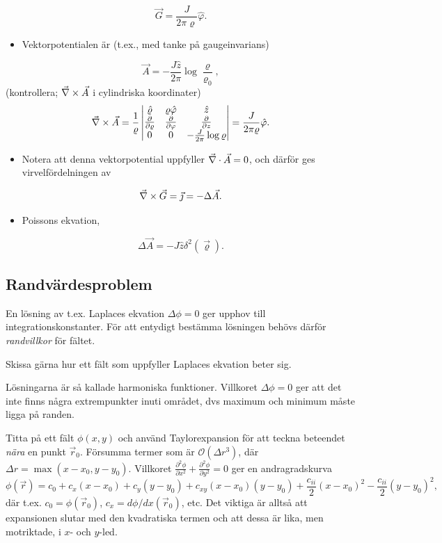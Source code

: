 \documentclass[%
oneside,                 %
final,                   %
10pt]{article}
\newenvironment{warning_mdfboxadmon}[1][]{
\begin{warning_mdfboxmdframed}[frametitle=#1]
}
{
\end{warning_mdfboxmdframed}
}
\begin{document}
\noindent
$$
\vec G=\frac{J}{2\pi\varrho}\hat\varphi.
$$
\begin{itemize}
\item Vektorpotentialen är (t.ex., med tanke på gaugeinvarians)
\end{itemize}

\noindent
$$
\vec A=-\frac{J\hat z}{2\pi}\log\frac{\varrho}{\varrho_0},
$$
(kontrollera; $\vec{\nabla}\times\vec A$ i cylindriska koordinater)
$$
\vec{\nabla}\times\vec A=\frac{1}{\varrho}
	\begin{vmatrix}
        \hat\varrho & \varrho\hat\varphi & \hat z \\ \frac{\partial}{\partial \varrho} & 
\frac{\partial}{\partial \varphi} &
        \frac{\partial}{\partial z} \\ 0\mbox{} & 0\mbox{} & -\frac{J}{2\pi}\log\varrho \\
        \end{vmatrix}
           =\frac{J}{2\pi\varrho}\hat\varphi.
$$
\begin{itemize}
\item Notera att denna vektorpotential uppfyller $\vec{\nabla}\cdot\vec A=0$, och därför ges virvelfördelningen av 
\end{itemize}

\noindent
$$
\vec{\nabla} \times \vec{G} = \vec{\jmath} = -\Delta\vec A.
$$ 
\begin{itemize}
\item Poissons ekvation, 
\end{itemize}

\noindent
$$
\Delta\vec A=-J\hat z\delta^2(\vec{\varrho}).
$$


\subsection*{Randvärdesproblem}

En lösning av t.ex. Laplaces ekvation $\Delta \phi = 0$ ger upphov till integrationskonstanter. För att entydigt bestämma lösningen behövs därför \emph{randvillkor} för fältet.


\begin{warning_mdfboxadmon}[Rita]
Skissa gärna hur ett fält som uppfyller Laplaces ekvation beter sig. 

Lösningarna är så kallade harmoniska funktioner. Villkoret $\Delta \phi = 0$ ger att det inte finns några extrempunkter inuti området, dvs maximum och minimum måste ligga på randen.

Titta på ett fält $\phi(x,y)$ och använd Taylorexpansion för att teckna beteendet \emph{nära} en punkt $\vec{r}_0$. Försumma termer som är $\mathcal{O}(\Delta r^3)$, där $\Delta r = \max(x-x_0,y-y_0)$. Villkoret $\frac{\partial^2\phi}{\partial x^2} + \frac{\partial^2\phi}{\partial y^2} = 0$ ger en andragradskurva 
$$
\phi(\vec{r}) =  c_0 + c_x (x-x_0) + c_y (y-y_0) + c_{xy} (x-x_0)(y-y_0)+ \frac{c_{ii}}{2}(x-x_0)^2 - \frac{c_{ii}}{2}(y-y_0)^2,
$$
där t.ex. $c_0 = \phi(\vec{r}_0)$, $c_x = d\phi/dx(\vec{r}_0)$, etc. Det viktiga är alltså att expansionen slutar med den kvadratiska termen och att dessa är lika, men motriktade, i $x$- och $y$-led.
\end{warning_mdfboxadmon} %
\end{document}
